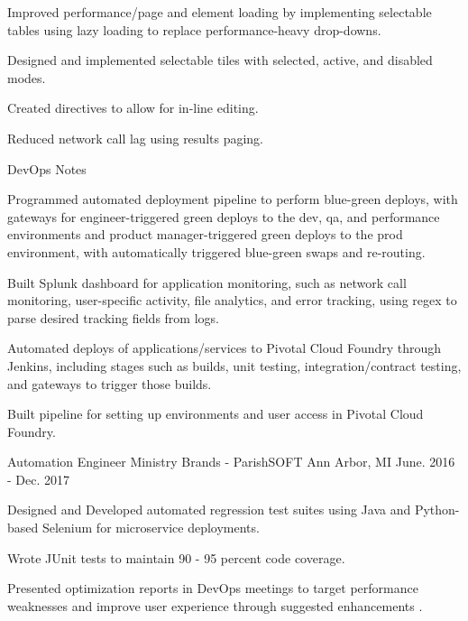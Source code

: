 \begin{cventries}
{\begin{cvitems}
\item {Improved performance/page and element loading by implementing selectable tables using lazy loading to replace performance-heavy drop-downs.}
\item {Designed and implemented selectable tiles with selected, active, and disabled modes.}
\item {Created directives to allow for in-line editing.}
\item {Reduced network call lag using results paging.}
\end{cvitems}
}
\vskip -0.5mm
\cventry
{DevOps Notes} {}{} {} %
{ %
\begin{cvitems}
\item {Programmed automated deployment pipeline to perform blue-green deploys, with gateways for engineer-triggered green deploys to the dev, qa, and performance environments and product manager-triggered green deploys to the prod environment, with automatically triggered blue-green swaps and re-routing.}
\item {Built Splunk dashboard for application monitoring, such as network call monitoring, user-specific activity, file analytics, and error tracking, using regex to parse desired tracking fields from logs.}
\item {Automated deploys of applications/services to Pivotal Cloud Foundry through Jenkins, including stages such as builds, unit testing, integration/contract testing, and gateways to trigger those builds.}
\item {Built pipeline for setting up environments and user access in Pivotal Cloud Foundry.}
\end{cvitems}
}


\vskip 2mm
\cventry
{Automation Engineer} %
{Ministry Brands - ParishSOFT} %
{Ann Arbor, MI} %
{June. 2016 - Dec. 2017} %
{ %
\begin{cvitems}
\item {Designed and Developed automated regression test suites using Java and Python-based Selenium for microservice deployments.}
\item {Wrote JUnit tests to maintain 90 - 95 percent code coverage.}
\item {Presented optimization reports in DevOps meetings to target performance weaknesses and improve user experience through suggested enhancements
.}
\end{cvitems}
}


\end{cventries}
